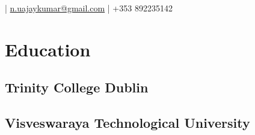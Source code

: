 \documentclass[]{openfont}
\begin{document}
%
%
\lastupdated

%
%

 { 
\href{https://ajaykumar4.github.io}{} |
\href{mailto:n.uajaykumar@gmail.com}{\emailsymbol{}n.uajaykumar@gmail.com} | 
\mobilephonesymbol{}+353 892235142 \linebreak
\locationsymbol{}\address{Galway, Ireland}
}

%
%

\begin{minipage}[t]{0.33\textwidth} 


\section{Education} 

\subsection{Trinity College Dublin}
\sectionsep

\subsection{Visveswaraya Technological University}
\sectionsep




\end{minipage}
\end{document}
